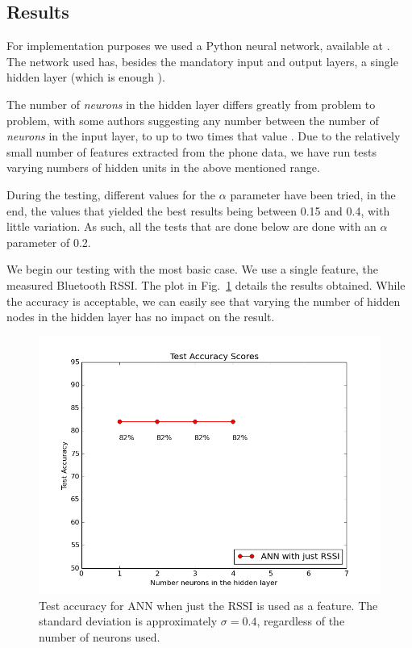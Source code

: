 \subsection{Results}

For implementation purposes we used a Python neural network, available at \cite{issam}. The network used has, besides the mandatory input and output layers, a single hidden layer (which is enough \cite{Hornik1989359,Hartman,cybenko}). 

The number of \textit{neurons} in the hidden layer differs greatly from problem to problem, with some authors suggesting any number between the number of \textit{neurons} in the input layer, to up to two times that value \cite{Stathakis}. Due to the relatively small number of features extracted from the phone data, we have run tests varying numbers of hidden units in the above mentioned range. 

During the testing, different values for the $\alpha$ parameter have been tried, in the end, the values that yielded the best results being between 0.15 and 0.4, with little variation. As such, all the tests that are done below are done with an $\alpha$ parameter of 0.2. 

We begin our testing with the most basic case. We use a single feature, the measured Bluetooth RSSI. The plot in Fig.~\ref{pic:ann_single} details the results obtained. While the accuracy is acceptable, we can easily see that varying the number of hidden nodes in the hidden layer has no impact on the result. 

\begin{figure}[h]
	\begin{center}
		\includegraphics[scale=0.6]{figures/ann_simple.png}
	\end{center}
	
	\caption{Test accuracy for ANN when just the RSSI is used as a feature. The standard deviation is approximately $\sigma = 0.4$, regardless of the number of neurons used.}
	\label{pic:ann_single}

\end{figure}

